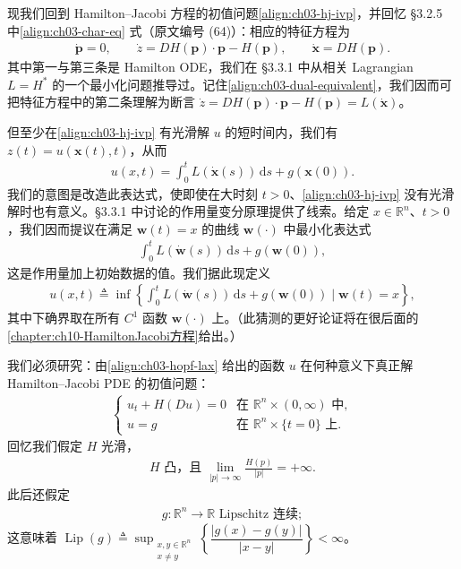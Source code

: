 \documentclass[../../main.tex]{subfiles}
\begin{document}
现我们回到 Hamilton--Jacobi 方程的初值问题\eqref{align:ch03-hj-ivp}，并回忆 \S3.2.5 中\eqref{align:ch03-char-eq} 式（原文编号 (64)）：相应的特征方程为
\begin{align*}
\dot{\mathbf{p}}=0,\qquad \dot{z}=DH(\mathbf{p})\cdot\mathbf{p}-H(\mathbf{p}),\qquad \dot{\mathbf{x}}=DH(\mathbf{p}).
\end{align*}
其中第一与第三条是 Hamilton ODE，我们在 \S3.3.1 中从相关 Lagrangian $L=H^*$ 的一个最小化问题推导过。记住\eqref{align:ch03-dual-equivalent}，我们因而可把特征方程中的第二条理解为断言 $\dot{z}=DH(\mathbf{p})\cdot\mathbf{p}-H(\mathbf{p})=L(\dot{\mathbf{x}})$。

但至少在\eqref{align:ch03-hj-ivp} 有光滑解 $u$ 的短时间内，我们有 $z(t)=u(\mathbf{x}(t),t)$，从而
\begin{align*}
u(x,t)=\int_0^t L(\dot{\mathbf{x}}(s))\,\mathrm{d}s+g(\mathbf{x}(0)).
\end{align*}
我们的意图是改造此表达式，使即使在大时刻 $t>0$、\eqref{align:ch03-hj-ivp} 没有光滑解时也有意义。\S3.3.1 中讨论的作用量变分原理提供了线索。给定 $x\in\mathbb{R}^n$、$t>0$，我们因而提议在满足 $\mathbf{w}(t)=x$ 的曲线 $\mathbf{w}(\cdot)$ 中最小化表达式
\begin{align*}
\int_0^t L(\dot{\mathbf{w}}(s))\,\mathrm{d}s+g(\mathbf{w}(0)),
\end{align*}
这是作用量加上初始数据的值。我们据此现定义
\begin{align}\label{align:ch03-hopf-lax}
u(x,t)\triangleq\inf\left\{\int_0^t L(\dot{\mathbf{w}}(s))\,\mathrm{d}s+g(\mathbf{w}(0))\mid\mathbf{w}(t)=x\right\},
\end{align}
其中下确界取在所有 $C^1$ 函数 $\mathbf{w}(\cdot)$ 上。（此猜测的更好论证将在很后面的\cref{chapter:ch10-HamiltonJacobi方程}给出。）

我们必须研究：由\eqref{align:ch03-hopf-lax} 给出的函数 $u$ 在何种意义下真正解 Hamilton--Jacobi PDE 的初值问题：
\begin{align}\label{align:ch03-hj-ivp2}
\begin{cases}
u_t+H(Du)=0 & \text{在 }\mathbb{R}^n\times(0,\infty)\text{ 中},\\
u=g & \text{在 }\mathbb{R}^n\times\{t=0\}\text{ 上}.
\end{cases}
\end{align}
回忆我们假定 $H$ 光滑，
\begin{align}\label{align:ch03-H-convex-coer}
H\text{ 凸，且 }\lim_{|p|\to\infty}\frac{H(p)}{|p|}=+\infty.
\end{align}
此后还假定
\begin{align}\label{align:ch03-g-lipschitz}
g:\mathbb{R}^n\to\mathbb{R}\text{ Lipschitz 连续};
\end{align}
这意味着 $\operatorname{Lip}(g)\triangleq\sup_{\substack{x,y\in\mathbb{R}^n\\x\neq y}}\left\{\dfrac{|g(x)-g(y)|}{|x-y|}\right\}<\infty$。
\end{document}
